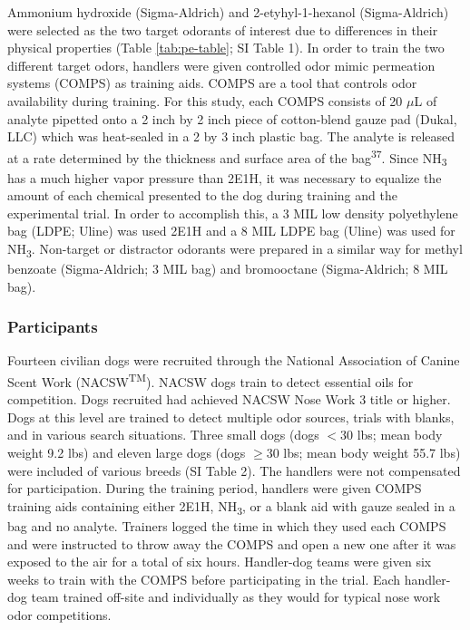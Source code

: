 \documentclass[
]{article}
\begin{document}
Ammonium hydroxide (Sigma-Aldrich) and 2-etyhyl-1-hexanol (Sigma-Aldrich) were selected as the two target odorants of interest due to differences in their physical properties (Table \ref{tab:pe-table}; SI Table 1). In order to train the two different target odors, handlers were given controlled odor mimic permeation systems (COMPS) as training aids. COMPS are a tool that controls odor availability during training. For this study, each COMPS consists of 20 \(\mu\)L of analyte pipetted onto a 2 inch by 2 inch piece of cotton-blend gauze pad (Dukal, LLC) which was heat-sealed in a 2 by 3 inch plastic bag. The analyte is released at a rate determined by the thickness and surface area of the bag\textsuperscript{37}. Since NH\textsubscript{3} has a much higher vapor pressure than 2E1H, it was necessary to equalize the amount of each chemical presented to the dog during training and the experimental trial. In order to accomplish this, a 3 MIL low density polyethylene bag (LDPE; Uline) was used 2E1H and a 8 MIL LDPE bag (Uline) was used for NH\textsubscript{3}. Non-target or distractor odorants were prepared in a similar way for methyl benzoate (Sigma-Aldrich; 3 MIL bag) and bromooctane (Sigma-Aldrich; 8 MIL bag).

\hypertarget{participants}{%
\subsubsection{Participants}\label{participants}}

Fourteen civilian dogs were recruited through the National Association of Canine Scent Work (NACSW\textsuperscript{TM}). NACSW dogs train to detect essential oils for competition. Dogs recruited had achieved NACSW Nose Work 3 title or higher. Dogs at this level are trained to detect multiple odor sources, trials with blanks, and in various search situations. Three small dogs (dogs \(< 30\) lbs; mean body weight 9.2 lbs) and eleven large dogs (dogs \(\geq 30\) lbs; mean body weight 55.7 lbs) were included of various breeds (SI Table 2). The handlers were not compensated for participation. During the training period, handlers were given COMPS training aids containing either 2E1H, NH\textsubscript{3}, or a blank aid with gauze sealed in a bag and no analyte. Trainers logged the time in which they used each COMPS and were instructed to throw away the COMPS and open a new one after it was exposed to the air for a total of six hours. Handler-dog teams were given six weeks to train with the COMPS before participating in the trial. Each handler-dog team trained off-site and individually as they would for typical nose work odor competitions.
\end{document}
